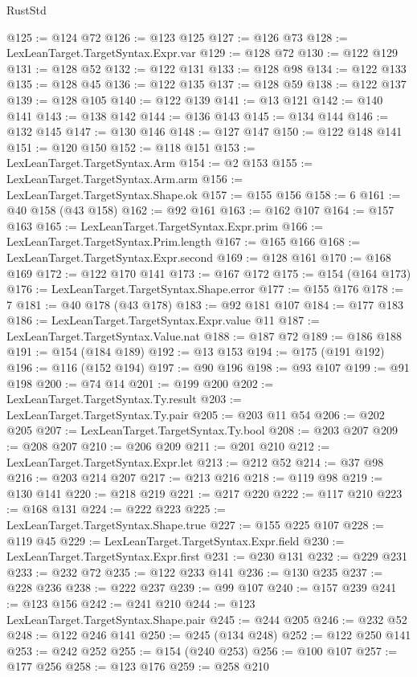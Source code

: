 \begin{lexlean}{RustStd}
\begin{coremodule}
@125 := @124 @72
@126 := @123 @125
@127 := @126 @73
@128 := LexLeanTarget.TargetSyntax.Expr.var
@129 := @128 @72
@130 := @122 @129
@131 := @128 @52
@132 := @122 @131
@133 := @128 @98
@134 := @122 @133
@135 := @128 @45
@136 := @122 @135
@137 := @128 @59
@138 := @122 @137
@139 := @128 @105
@140 := @122 @139
@141 := @13 @121
@142 := @140 @141
@143 := @138 @142
@144 := @136 @143
@145 := @134 @144
@146 := @132 @145
@147 := @130 @146
@148 := @127 @147
@150 := @122 @148 @141
@151 := @120 @150
@152 := @118 @151
@153 := LexLeanTarget.TargetSyntax.Arm
@154 := @2 @153
@155 := LexLeanTarget.TargetSyntax.Arm.arm
@156 := LexLeanTarget.TargetSyntax.Shape.ok
@157 := @155 @156
@158 := 6
@161 := @40 @158 (@43 @158)
@162 := @92 @161
@163 := @162 @107
@164 := @157 @163
@165 := LexLeanTarget.TargetSyntax.Expr.prim
@166 := LexLeanTarget.TargetSyntax.Prim.length
@167 := @165 @166
@168 := LexLeanTarget.TargetSyntax.Expr.second
@169 := @128 @161
@170 := @168 @169
@172 := @122 @170 @141
@173 := @167 @172
@175 := @154 (@164 @173)
@176 := LexLeanTarget.TargetSyntax.Shape.error
@177 := @155 @176
@178 := 7
@181 := @40 @178 (@43 @178)
@183 := @92 @181 @107
@184 := @177 @183
@186 := LexLeanTarget.TargetSyntax.Expr.value @11
@187 := LexLeanTarget.TargetSyntax.Value.nat
@188 := @187 @72
@189 := @186 @188
@191 := @154 (@184 @189)
@192 := @13 @153
@194 := @175 (@191 @192)
@196 := @116 (@152 @194)
@197 := @90 @196
@198 := @93 @107
@199 := @91 @198
@200 := @74 @14
@201 := @199 @200
@202 := LexLeanTarget.TargetSyntax.Ty.result
@203 := LexLeanTarget.TargetSyntax.Ty.pair
@205 := @203 @11 @54
@206 := @202 @205
@207 := LexLeanTarget.TargetSyntax.Ty.bool
@208 := @203 @207
@209 := @208 @207
@210 := @206 @209
@211 := @201 @210
@212 := LexLeanTarget.TargetSyntax.Expr.let
@213 := @212 @52
@214 := @37 @98
@216 := @203 @214 @207
@217 := @213 @216
@218 := @119 @98
@219 := @130 @141
@220 := @218 @219
@221 := @217 @220
@222 := @117 @210
@223 := @168 @131
@224 := @222 @223
@225 := LexLeanTarget.TargetSyntax.Shape.true
@227 := @155 @225 @107
@228 := @119 @45
@229 := LexLeanTarget.TargetSyntax.Expr.field
@230 := LexLeanTarget.TargetSyntax.Expr.first
@231 := @230 @131
@232 := @229 @231
@233 := @232 @72
@235 := @122 @233 @141
@236 := @130 @235
@237 := @228 @236
@238 := @222 @237
@239 := @99 @107
@240 := @157 @239
@241 := @123 @156
@242 := @241 @210
@244 := @123 LexLeanTarget.TargetSyntax.Shape.pair
@245 := @244 @205
@246 := @232 @52
@248 := @122 @246 @141
@250 := @245 (@134 @248)
@252 := @122 @250 @141
@253 := @242 @252
@255 := @154 (@240 @253)
@256 := @100 @107
@257 := @177 @256
@258 := @123 @176
@259 := @258 @210

\end{coremodule}
\end{lexlean}
